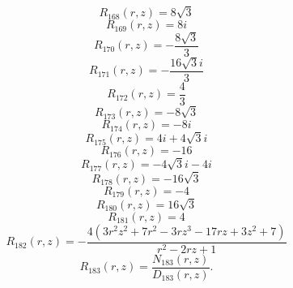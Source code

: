 \documentclass[11pt,a4paper]{article}
\begin{document}
\begin{equation}
R_{168}(r,z)=8 \sqrt{3}
\label{eq:cat-rational-168}
\end{equation}
\begin{equation}
R_{169}(r,z)=8 i
\label{eq:cat-rational-169}
\end{equation}
\begin{equation}
R_{170}(r,z)=- \frac{8 \sqrt{3}}{3}
\label{eq:cat-rational-170}
\end{equation}
\begin{equation}
R_{171}(r,z)=- \frac{16 \sqrt{3} i}{3}
\label{eq:cat-rational-171}
\end{equation}
\begin{equation}
R_{172}(r,z)=\frac{4}{3}
\label{eq:cat-rational-172}
\end{equation}
\begin{equation}
R_{173}(r,z)=- 8 \sqrt{3}
\label{eq:cat-rational-173}
\end{equation}
\begin{equation}
R_{174}(r,z)=- 8 i
\label{eq:cat-rational-174}
\end{equation}
\begin{equation}
R_{175}(r,z)=4 i + 4 \sqrt{3} i
\label{eq:cat-rational-175}
\end{equation}
\begin{equation}
R_{176}(r,z)=-16
\label{eq:cat-rational-176}
\end{equation}
\begin{equation}
R_{177}(r,z)=- 4 \sqrt{3} i - 4 i
\label{eq:cat-rational-177}
\end{equation}
\begin{equation}
R_{178}(r,z)=- 16 \sqrt{3}
\label{eq:cat-rational-178}
\end{equation}
\begin{equation}
R_{179}(r,z)=-4
\label{eq:cat-rational-179}
\end{equation}
\begin{equation}
R_{180}(r,z)=16 \sqrt{3}
\label{eq:cat-rational-180}
\end{equation}
\begin{equation}
R_{181}(r,z)=4
\label{eq:cat-rational-181}
\end{equation}
\begin{equation}
R_{182}(r,z)=- \frac{4 \left(3 r^{2} z^{2} + 7 r^{2} - 3 r z^{3} - 17 r z + 3 z^{2} + 7\right)}{r^{2} - 2 r z + 1}
\label{eq:cat-rational-182}
\end{equation}
\begin{equation}
R_{183}(r,z)=\frac{N_{183}(r,z)}{D_{183}(r,z)}.
\label{eq:cat-rational-183}
\end{equation}
\end{document}
